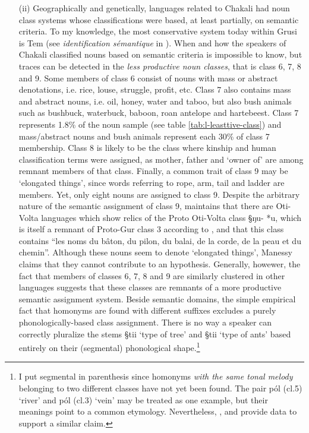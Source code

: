 \begin{enumerate}
 \item[(ii)]
Geographically and genetically, languages related to Chakali had noun class
systems whose classifications were based, at least partially, on semantic
criteria. To my knowledge, the most conservative system today  within Grusi is
Tem (see {\it identification sémantique} in \cite{Tcha07}). When and how the
speakers of Chakali  classified nouns based on semantic criteria is impossible
to know,  but traces can be detected in  the   {\it less productive noun
classes}, that is class 6, 7, 8 and 9.
Some members of class 6 consist of
nouns with mass or abstract  denotations, i.e. rice,  louse, struggle, profit,
etc.  Class 7 also contains mass and abstract nouns, i.e. oil,  honey, water and
 taboo, but also bush animals such as bushbuck, waterbuck, baboon, roan
antelope and hartebeest. Class 7 represents 1.8\% of the noun sample
(see table \ref{tab:l-leasttive-class}) and  mass/abstract nouns and bush
animals
represent each  
30\% of class 7 membership. Class 8 is likely to be the class where kinship and 
human
classification terms were assigned, 
as
mother, father and `owner of' are among
remnant
members of that class.  Finally, a  common trait of class 9 may be
`elongated things', since words referring to  rope, arm, tail and ladder are
members. Yet, only eight nouns are
assigned to class 9. Despite the arbitrary nature of the semantic
assignment of class 9,  \citet[94]{Mane75} maintains that there are Oti-Volta
languages which show relics of  the Proto Oti-Volta class {\S *ŋu- *u},
which is  itself a remnant of Proto-Gur class 3   according to
\citet[11]{Mieh06}, and that this class contains ``les noms du bâton, du pilon,
du balai, de la corde, de la peau et du chemin''.  Although these nouns seem
to
 denote `elongated  things',   Manessy claims that they cannot contribute to
an hypothesis. Generally, howewer, the fact that members of classes 6, 7, 8 and
9 are
similarly clustered in other languages suggests that these classes are remnants
of a more productive semantic assignment system. %
Beside semantic
domains, the simple empirical fact that homonyms are found with
different suffixes excludes a purely phonologically-based class assignment.
There is no way a speaker can correctly pluralize the stems {\S tii} `type of
tree' and {\S tii} `type of ants' based entirely on their (segmental)
phonological shape.\footnote{I put segmental in parenthesis since  homonyms {\it
with the same tonal melody} belonging to two different
classes have not yet been  found. The pair {\F pól} ({\sc cl.5}) `river' and
{\F pól}
({\sc cl.3}) 
`vein' may be treated as one example, but their meanings point to a
common etymology. Nevertheless, \cite{Bonv88}, \cite{Awed07} and \cite{Tcha07}
provide data to support a similar claim.} 
 

\end{enumerate}

